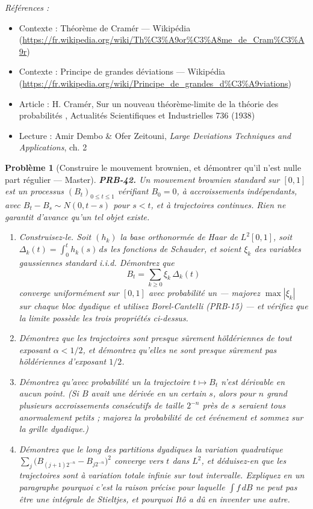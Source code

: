 \documentclass[11pt]{article}
\newtheorem{problem}{Problème}
\newenvironment{refs}{\par\small\noindent\emph{Références :}\begin{itemize}\setlength\itemsep{0pt}}{\end{itemize}\normalsize}
\begin{document}
\begin{refs}
\item Contexte : Théorème de Cramér --- Wikipédia (\url{https://fr.wikipedia.org/wiki/Th%C3%A9or%C3%A8me_de_Cram%C3%A9r})
\item Contexte : Principe de grandes déviations --- Wikipédia (\url{https://fr.wikipedia.org/wiki/Principe_de_grandes_d%C3%A9viations})
\item Article : H. Cramér, \og{} Sur un nouveau théorème-limite de la théorie des probabilités \fg{}, Actualités Scientifiques et Industrielles 736 (1938)
\item Lecture : Amir Dembo \& Ofer Zeitouni, \textit{Large Deviations Techniques and Applications}, ch. 2
\end{refs}

\bigskip

\begin{problem}[{Construire le mouvement brownien, et démontrer qu'il n'est nulle part régulier --- Master}]
\textbf{PRB-42.} Un mouvement brownien standard sur $ [0,1] $ est un processus
$ (B_t)_{0 \le t \le 1} $ vérifiant $ B_0 = 0 $, à accroissements indépendants, avec
$ B_t - B_s \sim N(0, t-s) $ pour $ s < t $, et à trajectoires continues. Rien ne garantit
d'avance qu'un tel objet existe.
\begin{enumerate}
\item[(a)] Construisez-le. Soit $ (h_k) $ la base orthonormée de Haar de $ L^2[0,1] $, soit
$ \Delta_k(t) = \int_0^t h_k(s)\,ds $ les fonctions de Schauder, et soient $ \xi_k $ des
variables gaussiennes standard i.i.d. Démontrez que
\[ B_t = \sum_{k \ge 0} \xi_k \, \Delta_k(t) \]
converge uniformément sur $ [0,1] $ avec probabilité un --- majorez $ \max |\xi_k| $ sur chaque
bloc dyadique et utilisez Borel-Cantelli (PRB-15) --- et vérifiez que la limite possède les trois
propriétés ci-dessus.
\item[(b)] Démontrez que les trajectoires sont presque sûrement höldériennes de tout exposant
$ \alpha < 1/2 $, et démontrez qu'elles ne sont presque sûrement \textit{pas} höldériennes
d'exposant $ 1/2 $.
\item[(c)] Démontrez qu'avec probabilité un la trajectoire $ t \mapsto B_t $ n'est dérivable en aucun
point. (Si $ B $ avait une dérivée en un certain $ s $, alors pour $ n $ grand plusieurs
accroissements consécutifs de taille $ 2^{-n} $ près de $ s $ seraient tous anormalement
petits ; majorez la probabilité de cet événement et sommez sur la grille dyadique.)
\item[(d)] Démontrez que le long des partitions dyadiques la variation quadratique
$ \sum_{j} \big( B_{(j+1)2^{-n}} - B_{j 2^{-n}} \big)^2 $ converge vers $ t $ dans
$ L^2 $, et déduisez-en que les trajectoires sont à variation totale infinie sur tout intervalle.
Expliquez en un paragraphe pourquoi c'est la raison précise pour laquelle $ \int f\, dB $ ne peut
pas être une intégrale de Stieltjes, et pourquoi Itô a dû en inventer une autre.
\end{enumerate}

\end{problem}
\end{document}
